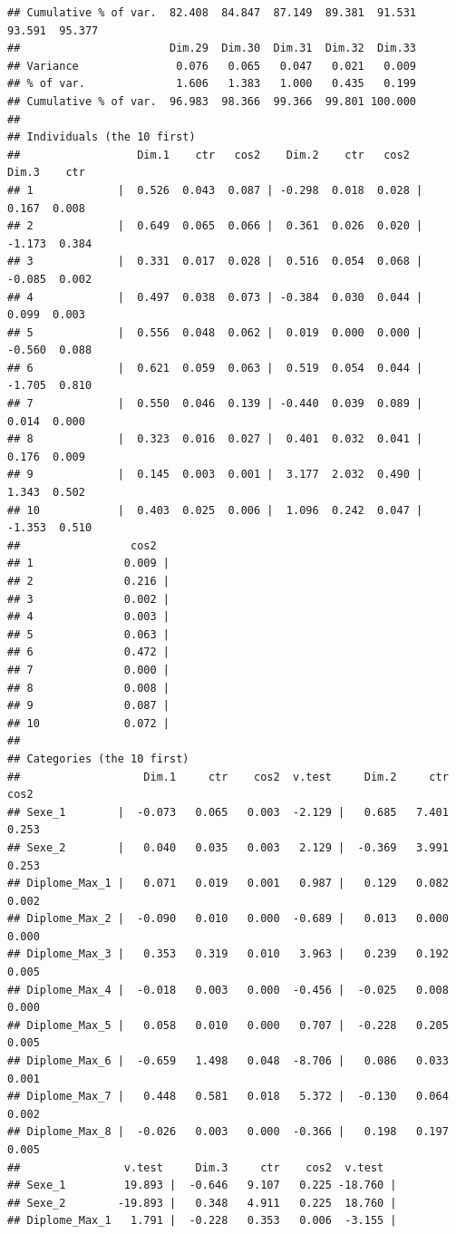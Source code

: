 \documentclass[11pt,a4paper, x11names]{article}\usepackage[]{graphicx}\usepackage[]{color}
\makeatletter
\newenvironment{kframe}{%
 \def\at@end@of@kframe{}%
 \ifinner\ifhmode%
  \def\at@end@of@kframe{\end{minipage}}%
  \begin{minipage}{\columnwidth}%
 \fi\fi%
 \def\FrameCommand##1{\hskip\@totalleftmargin \hskip-\fboxsep
 \colorbox{shadecolor}{##1}\hskip-\fboxsep
     \hskip-\linewidth \hskip-\@totalleftmargin \hskip\columnwidth}%
 \MakeFramed {\advance\hsize-\width
   \@totalleftmargin\z@ \linewidth\hsize
   \@setminipage}}%
 {\par\unskip\endMakeFramed%
 \at@end@of@kframe}
\newenvironment{knitrout}{}{} %
\makeatother
\begin{document}
\begin{knitrout}
\begin{kframe}
\begin{verbatim}
## Cumulative % of var.  82.408  84.847  87.149  89.381  91.531  93.591  95.377
##                       Dim.29  Dim.30  Dim.31  Dim.32  Dim.33
## Variance               0.076   0.065   0.047   0.021   0.009
## % of var.              1.606   1.383   1.000   0.435   0.199
## Cumulative % of var.  96.983  98.366  99.366  99.801 100.000
## 
## Individuals (the 10 first)
##                  Dim.1    ctr   cos2    Dim.2    ctr   cos2    Dim.3    ctr
## 1             |  0.526  0.043  0.087 | -0.298  0.018  0.028 |  0.167  0.008
## 2             |  0.649  0.065  0.066 |  0.361  0.026  0.020 | -1.173  0.384
## 3             |  0.331  0.017  0.028 |  0.516  0.054  0.068 | -0.085  0.002
## 4             |  0.497  0.038  0.073 | -0.384  0.030  0.044 |  0.099  0.003
## 5             |  0.556  0.048  0.062 |  0.019  0.000  0.000 | -0.560  0.088
## 6             |  0.621  0.059  0.063 |  0.519  0.054  0.044 | -1.705  0.810
## 7             |  0.550  0.046  0.139 | -0.440  0.039  0.089 |  0.014  0.000
## 8             |  0.323  0.016  0.027 |  0.401  0.032  0.041 |  0.176  0.009
## 9             |  0.145  0.003  0.001 |  3.177  2.032  0.490 |  1.343  0.502
## 10            |  0.403  0.025  0.006 |  1.096  0.242  0.047 | -1.353  0.510
##                 cos2  
## 1              0.009 |
## 2              0.216 |
## 3              0.002 |
## 4              0.003 |
## 5              0.063 |
## 6              0.472 |
## 7              0.000 |
## 8              0.008 |
## 9              0.087 |
## 10             0.072 |
## 
## Categories (the 10 first)
##                   Dim.1     ctr    cos2  v.test     Dim.2     ctr    cos2
## Sexe_1        |  -0.073   0.065   0.003  -2.129 |   0.685   7.401   0.253
## Sexe_2        |   0.040   0.035   0.003   2.129 |  -0.369   3.991   0.253
## Diplome_Max_1 |   0.071   0.019   0.001   0.987 |   0.129   0.082   0.002
## Diplome_Max_2 |  -0.090   0.010   0.000  -0.689 |   0.013   0.000   0.000
## Diplome_Max_3 |   0.353   0.319   0.010   3.963 |   0.239   0.192   0.005
## Diplome_Max_4 |  -0.018   0.003   0.000  -0.456 |  -0.025   0.008   0.000
## Diplome_Max_5 |   0.058   0.010   0.000   0.707 |  -0.228   0.205   0.005
## Diplome_Max_6 |  -0.659   1.498   0.048  -8.706 |   0.086   0.033   0.001
## Diplome_Max_7 |   0.448   0.581   0.018   5.372 |  -0.130   0.064   0.002
## Diplome_Max_8 |  -0.026   0.003   0.000  -0.366 |   0.198   0.197   0.005
##                v.test     Dim.3     ctr    cos2  v.test  
## Sexe_1         19.893 |  -0.646   9.107   0.225 -18.760 |
## Sexe_2        -19.893 |   0.348   4.911   0.225  18.760 |
## Diplome_Max_1   1.791 |  -0.228   0.353   0.006  -3.155 |

\end{verbatim}
\end{kframe}
\end{knitrout}
\end{document}
